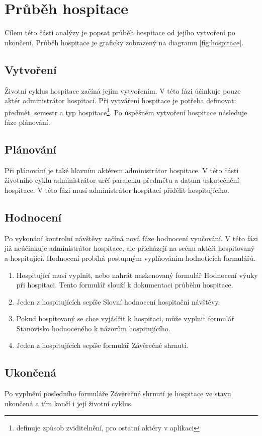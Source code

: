 \newpage 
\section{Průběh hospitace}
Cílem této části analýzy je popsat průběh hospitace od jejího vytvoření po ukončení. Průběh hospitace je graficky zobrazený na diagramu \ref{fig:hospitace}.

\subsection{Vytvoření}
Životní cyklus hospitace začíná jejím vytvořením. V této fázi účinkuje pouze aktér administrátor hospitací. Při vytváření hospitace je potřeba definovat: předmět, semestr a typ hospitace\footnote{definuje způsob zviditelnění, pro ostatní aktéry v aplikaci}. Po úspěšném vytvoření hospitace následuje fáze plánování.

\subsection{Plánování}
Při plánování je také hlavním aktérem administrátor hospitace. V této části životního cyklu administrátor určí paralelku předmětu a datum uskutečnění hospitace. V této fázi musí administrátor hospitací přidělit hospitujícího.  
 
\subsection{Hodnocení}
Po vykonání kontrolní návštěvy začíná nová fáze hodnocení vyučování. V této fázi již neúčinkuje administrátor hospitace, ale přicházejí na scénu aktéři hospitovaný a hospitující. Hodnocení probíhá postupným vyplňováním hodnotících formulářů. 
\begin{enumerate}
\item Hospitující musí vyplnit, nebo nahrát naskenovaný formulář Hodnocení výuky při hospitaci. Tento formulář slouží k dokumentaci průběhu hospitace.
\item Jeden z hospitujících sepíše Slovní hodnocení hospitační návštěvy.
\item Pokud hospitovaný se chce vyjádřit k hospitaci, může vyplnit formulář Stanovisko hodnoceného k názorům hospitujícího.
\item Jeden z hospitujících sepíše formulář Závěrečné shrnutí.
\end{enumerate}
 
\subsection{Ukončená}
Po vyplnění posledního formuláře Závěrečné shrnutí je hospitace ve stavu ukončená a tím končí i její životní cyklus.

